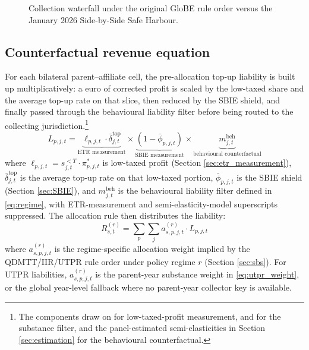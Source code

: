 \documentclass[11pt,a4paper]{article}
\begin{document}
\begin{figure}[H]
{
}
\caption[Allocation rule under the Side-by-Side Safe Harbour.]{Collection waterfall under the original GloBE rule order versus the January 2026 Side-by-Side Safe Harbour.}
\label{fig:sbs_waterfall}
\end{figure}

\subsection{Counterfactual revenue equation}\label{sec:pipeline}

For each bilateral parent--affiliate cell, the pre-allocation top-up liability is built up multiplicatively: a euro of corrected profit is scaled by the low-taxed share and the average top-up rate on that slice, then reduced by the SBIE shield, and finally passed through the behavioural liability filter before being routed to the collecting jurisdiction.\footnote{The components draw on \citet{hugger2026} for low-taxed-profit measurement, \citet{schjelderup2024} and \citet{devereux2023} for the substance filter, and the panel-estimated semi-elasticities in Section \ref{sec:estimation} for the behavioural counterfactual.}
\begin{equation}\label{eq:pipeline}
L_{p,j,t} = \underbrace{\ell_{p,j,t} \cdot \bar{\delta}_{j,t}^{\text{top}}}_{\text{ETR measurement}} \times \underbrace{\left(1 - \bar{\phi}_{p,j,t}\right)}_{\text{SBIE measurement}} \times \underbrace{m_{j,t}^{\text{beh}}}_{\text{behavioural counterfactual}}
\end{equation}
where $\ell_{p,j,t} = s_{j,t}^{<T} \cdot \pi_{p,j,t}^{*}$ is low-taxed profit (Section \ref{sec:etr_measurement}), $\bar{\delta}_{j,t}^{\text{top}}$ is the average top-up rate on that low-taxed portion, $\bar{\phi}_{p,j,t}$ is the SBIE shield (Section \ref{sec:SBIE}), and $m_{j,t}^{\text{beh}}$ is the behavioural liability filter defined in \eqref{eq:regime}, with ETR-measurement and semi-elasticity-model superscripts suppressed. The allocation rule then distributes the liability:
\begin{equation}\label{eq:allocation}
R_{s,t}^{(r)} = \sum_p \sum_j a_{s,p,j,t}^{(r)} \cdot L_{p,j,t}
\end{equation}
where $a_{s,p,j,t}^{(r)}$ is the regime-specific allocation weight implied by the QDMTT/IIR/UTPR rule order under policy regime $r$ (Section \ref{sec:sbs}). For UTPR liabilities, $a_{s,p,j,t}^{(r)}$ is the parent-year substance weight in \eqref{eq:utpr_weight}, or the global year-level fallback where no parent-year collector key is available.
\end{document}
